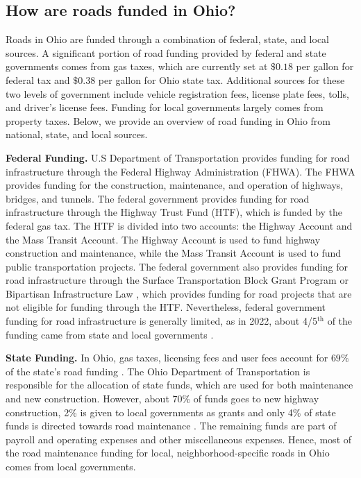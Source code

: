 \subsection{How are roads funded in Ohio?}

Roads in Ohio are funded through a combination of federal, state, and local sources. A significant portion of road funding provided by federal and state governments comes from gas taxes, which are currently set at $\$0.18$ per gallon for federal tax and $\$0.38$ per gallon for Ohio state tax. Additional sources for these two levels of government include vehicle registration fees, license plate fees, tolls, and driver's license fees. Funding for local governments largely comes from property taxes. Below, we provide an overview of road funding in Ohio from national, state, and local sources.

{\bf Federal Funding.} U.S Department of Transportation provides funding for road infrastructure through the Federal Highway Administration (FHWA). The FHWA provides funding for the construction, maintenance, and operation of highways, bridges, and tunnels. The federal government provides funding for road infrastructure through the Highway Trust Fund (HTF), which is funded by the federal gas tax. The HTF is divided into two accounts: the Highway Account and the Mass Transit Account. The Highway Account is used to fund highway construction and maintenance, while the Mass Transit Account is used to fund public transportation projects. The federal government also provides funding for road infrastructure through the Surface Transportation Block Grant Program or Bipartisan Infrastructure Law \citep{USDOT_BIL_Ohio}, which provides funding for road projects that are not eligible for funding through the HTF. Nevertheless, federal government funding for road infrastructure is generally limited, as in 2022, about 4/5$^\text{th}$ of the funding came from state and local governments \citep{pgpf_htf_explained}.

{\bf State Funding.}
In Ohio, gas taxes, licensing fees and user fees account for $69\%$ of the state's road funding \citep{boesen2021}. The Ohio Department of Transportation is responsible for the allocation of state funds, which are used for both maintenance and new construction. However, about 70\% of funds goes to new highway construction, 2\% is given to local governments as grants and only 4\% of state funds is directed towards road maintenance \citep{odot2023}. The remaining funds are part of payroll and operating expenses and other miscellaneous expenses. Hence, most of the road maintenance funding for local, neighborhood-specific roads in Ohio comes from local governments.

